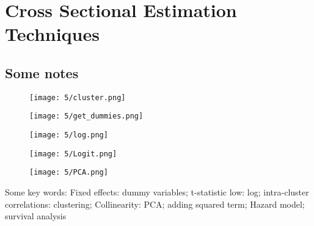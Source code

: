 \section{Cross Sectional Estimation Techniques}
\subsection{Some notes}
\begin{figure}[!ht]
	\centering
	\texttt{[image: 5/cluster.png]}
\end{figure}
\begin{figure}[!ht]
	\centering
	\texttt{[image: 5/get\_dummies.png]}
\end{figure}
\begin{figure}[!ht]
	\centering
	\texttt{[image: 5/log.png]}
\end{figure}
\begin{figure}[!ht]
	\centering
	\texttt{[image: 5/Logit.png]}
\end{figure}
\begin{figure}[!ht]
	\centering
	\texttt{[image: 5/PCA.png]}
\end{figure}

\begin{remark}
    Some key words: Fixed effects: dummy variables; t-statistic low: log; intra-cluster correlations: clustering; Collinearity: PCA; adding squared term; Hazard model; survival analysis 
\end{remark}